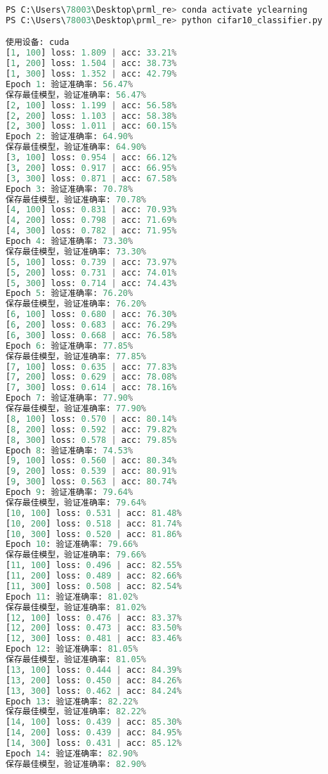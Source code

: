 \documentclass[UTF8]{report}
\theoremstyle{MyLineTheoremStyle} %
\theoremstyle{MyBlockTheoremStyle} %
\theoremstyle{MySubsubsectionStyle} %
\begin{document}
\begin{lstlisting}[language=python, caption={CNN训练结果一}, label={lst:cnn_train_result}]
PS C:\Users\78003\Desktop\prml_re> conda activate yclearning
PS C:\Users\78003\Desktop\prml_re> python cifar10_classifier.py

使用设备: cuda
[1, 100] loss: 1.809 | acc: 33.21%
[1, 200] loss: 1.504 | acc: 38.73%
[1, 300] loss: 1.352 | acc: 42.79%
Epoch 1: 验证准确率: 56.47%
保存最佳模型，验证准确率: 56.47%
[2, 100] loss: 1.199 | acc: 56.58%
[2, 200] loss: 1.103 | acc: 58.38%
[2, 300] loss: 1.011 | acc: 60.15%
Epoch 2: 验证准确率: 64.90%
保存最佳模型，验证准确率: 64.90%
[3, 100] loss: 0.954 | acc: 66.12%
[3, 200] loss: 0.917 | acc: 66.95%
[3, 300] loss: 0.871 | acc: 67.58%
Epoch 3: 验证准确率: 70.78%
保存最佳模型，验证准确率: 70.78%
[4, 100] loss: 0.831 | acc: 70.93%
[4, 200] loss: 0.798 | acc: 71.69%
[4, 300] loss: 0.782 | acc: 71.95%
Epoch 4: 验证准确率: 73.30%
保存最佳模型，验证准确率: 73.30%
[5, 100] loss: 0.739 | acc: 73.97%
[5, 200] loss: 0.731 | acc: 74.01%
[5, 300] loss: 0.714 | acc: 74.43%
Epoch 5: 验证准确率: 76.20%
保存最佳模型，验证准确率: 76.20%
[6, 100] loss: 0.680 | acc: 76.30%
[6, 200] loss: 0.683 | acc: 76.29%
[6, 300] loss: 0.668 | acc: 76.58%
Epoch 6: 验证准确率: 77.85%
保存最佳模型，验证准确率: 77.85%
[7, 100] loss: 0.635 | acc: 77.83%
[7, 200] loss: 0.629 | acc: 78.08%
[7, 300] loss: 0.614 | acc: 78.16%
Epoch 7: 验证准确率: 77.90%
保存最佳模型，验证准确率: 77.90%
[8, 100] loss: 0.570 | acc: 80.14%
[8, 200] loss: 0.592 | acc: 79.82%
[8, 300] loss: 0.578 | acc: 79.85%
Epoch 8: 验证准确率: 74.53%
[9, 100] loss: 0.560 | acc: 80.34%
[9, 200] loss: 0.539 | acc: 80.91%
[9, 300] loss: 0.563 | acc: 80.74%
Epoch 9: 验证准确率: 79.64%
保存最佳模型，验证准确率: 79.64%
[10, 100] loss: 0.531 | acc: 81.48%
[10, 200] loss: 0.518 | acc: 81.74%
[10, 300] loss: 0.520 | acc: 81.86%
Epoch 10: 验证准确率: 79.66%
保存最佳模型，验证准确率: 79.66%
[11, 100] loss: 0.496 | acc: 82.55%
[11, 200] loss: 0.489 | acc: 82.66%
[11, 300] loss: 0.508 | acc: 82.54%
Epoch 11: 验证准确率: 81.02%
保存最佳模型，验证准确率: 81.02%
[12, 100] loss: 0.476 | acc: 83.37%
[12, 200] loss: 0.473 | acc: 83.50%
[12, 300] loss: 0.481 | acc: 83.46%
Epoch 12: 验证准确率: 81.05%
保存最佳模型，验证准确率: 81.05%
[13, 100] loss: 0.444 | acc: 84.39%
[13, 200] loss: 0.450 | acc: 84.26%
[13, 300] loss: 0.462 | acc: 84.24%
Epoch 13: 验证准确率: 82.22%
保存最佳模型，验证准确率: 82.22%
[14, 100] loss: 0.439 | acc: 85.30%
[14, 200] loss: 0.439 | acc: 84.95%
[14, 300] loss: 0.431 | acc: 85.12%
Epoch 14: 验证准确率: 82.90%
保存最佳模型，验证准确率: 82.90%

\end{lstlisting}
\end{document}
